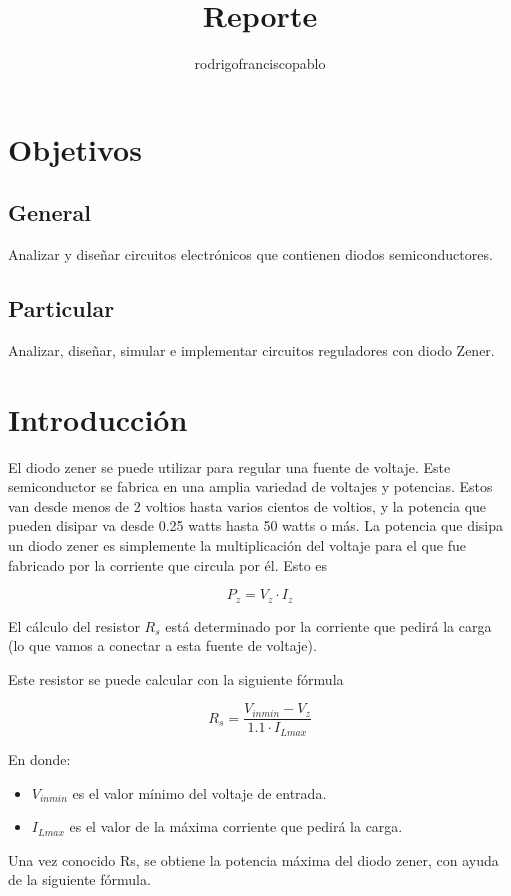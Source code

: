 \documentclass{mylib/reporteConCalif}
\title{Reporte}
\author{rodrigofranciscopablo }
\begin{document}
\coverPage


\section{Objetivos}

\subsection{General}

Analizar y diseñar circuitos electrónicos que contienen diodos semiconductores.

\subsection{Particular}

Analizar, diseñar, simular e implementar circuitos reguladores con diodo Zener.

\section{Introducción}

El diodo zener se puede utilizar para regular una fuente de voltaje. Este semiconductor se fabrica en una amplia variedad de voltajes y potencias.
Estos van desde menos de 2 voltios hasta varios cientos de voltios, y la potencia que pueden disipar va desde 0.25 watts hasta 50 watts o más.
La potencia que disipa un diodo zener es simplemente la multiplicación del voltaje para el que fue fabricado por la corriente que circula por él. Esto es

$$ P_z = V_z \cdot I_z$$

El cálculo del resistor $R_s$ está determinado por la corriente que pedirá la carga (lo que vamos a conectar a esta fuente de voltaje). 

Este resistor se puede calcular con la siguiente fórmula

$$R_s = \frac{V_{in min}- V_z}{1.1 \cdot I_{L max}}$$

En donde:
\begin{itemize}
	\item $V_{in min}$ es el valor mínimo del voltaje de entrada.
	\item $I_{L max}$ es el valor de la máxima corriente que pedirá la carga.
\end{itemize}	

Una vez conocido Rs, se obtiene la potencia máxima del diodo zener, con ayuda de la siguiente fórmula.
\end{document}
